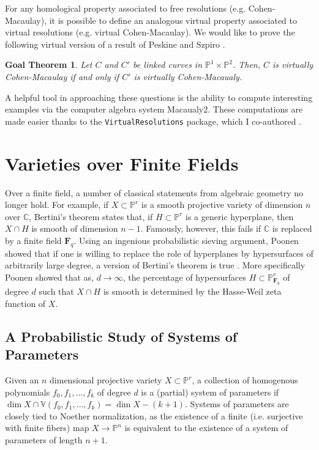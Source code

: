\documentclass[11pt,reqno]{amsart}
\newtheorem{goalTheorem}[lemma]{Goal Theorem}
\theoremstyle{remark}
\newcommand{\fF}{\mathbf F}
\newcommand{\C}{\mathbb{C}}
\renewcommand{\P}{\mathbb{P}}
\newcommand{\V}{\mathbb{V}}
\begin{document}
For any homological property associated to free resolutions (e.g. Cohen-Macaulay), it is possible to define an analogous virtual property associated to virtual resolutions (e.g. virtual Cohen-Macaulay). We would like to prove the following virtual version of a result of Peskine and Szpiro \cite{peskineSzpiro74}. 

\begin{goalTheorem}\label{goalTheorem:virtualACM}
Let $C$ and $C'$ be linked curves in $\P^1\times\P^2$. Then, $C$ is virtually Cohen-Macaulay if and only if $C'$ is virtually Cohen-Macaualy.
\end{goalTheorem}


A helpful tool in approaching these questions is the ability to compute interesting examples via the computer algebra system Macaualy2. These computations are made easier thanks to the  \texttt{VirtualResolutions} package, which I co-authored \cite{almousaBruce19}.
 
\section{Varieties over Finite Fields}

Over a finite field, a number of classical statements from algebraic geometry no longer hold. For example, if $X\subset\P^r$ is a smooth projective variety of dimension $n$ over $\C$, Bertini's theorem states that, if $H\subset \P^r$ is a generic hyperplane, then $X\cap H$ is smooth of dimension $n-1$. Famously, however, this fails if $\C$ is replaced by a finite field $\fF_{q}$. Using an ingenious probabilistic sieving argument, Poonen showed that if one is willing to replace the role of hyperplanes by hypersurfaces of arbitrarily large degree, a version of Bertini's theorem is true \cite{poonen04}. More specifically Poonen showed that as, $d\to\infty$, the percentage of hypersurfaces $H\subset \P_{\fF_{q}}^{r}$ of degree $d$ such that $X\cap H$ is smooth is determined by the Hasse-Weil zeta function of $X$.


\subsection{A Probabilistic Study of Systems of Parameters} 

Given an $n$ dimensional projective variety $X\subset \P^r$, a collection of homogenous polynomials $f_{0},f_{1},\ldots,f_{k}$ of degree $d$ is a (partial) system of parameters if $\dim X\cap \V(f_{0},f_{1},\ldots,f_{k}) = \dim X - (k+1)$. Systems of parameters are closely tied to Noether normalization, as the existence of a finite (i.e. surjective with finite fibers) map $X\rightarrow \P^n$ is equivalent to the existence of a system of parameters of length $n+1$.
\end{document}
